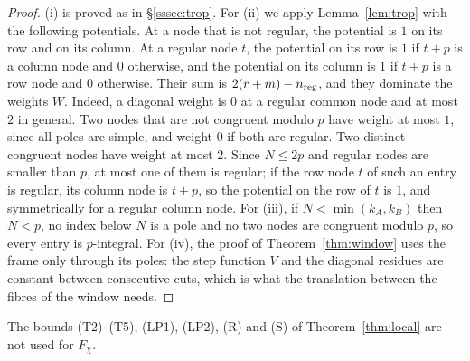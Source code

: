 \documentclass[11pt]{amsart}
\theoremstyle{definition}
\theoremstyle{remark}
\numberwithin{equation}{section}
\begin{document}
\begin{proof}
(i) is proved as in \S\ref{sssec:trop}. For (ii) we apply Lemma~\ref{lem:trop} with the following potentials. At a node
that is not regular, the potential is $1$ on its row and on its column. At a regular node $t$, the potential on its row is
$1$ if $t+p$ is a column node and $0$ otherwise, and the potential on its column is $1$ if $t+p$ is a row node and $0$
otherwise. Their sum is $2(r+m)-n_{\rm reg}$, and they dominate the weights $W$. Indeed, a diagonal weight is $0$ at a regular
common node and at most $2$ in general. Two nodes that are not congruent modulo $p$ have weight at most $1$, since all
poles are simple, and weight $0$ if both are regular. Two distinct congruent nodes have weight at most $2$. Since $N\le2p$
and regular nodes are smaller than $p$, at most one of them is regular; if the row node $t$ of such an entry is regular,
its column node is $t+p$, so the potential on the row of $t$ is $1$, and symmetrically for a regular column node. For (iii), if $N<\min(k_A,k_B)$ then $N<p$, no index below $N$ is a
pole and no two nodes are congruent modulo $p$, so every entry is $p$-integral. For (iv), the proof of
Theorem~\ref{thm:window} uses the frame only through its poles: the step function $V$ and the diagonal residues are
constant between consecutive cuts, which is what the translation between the fibres of the window needs.
\end{proof}

The bounds (T2)--(T5), (LP1), (LP2), (R) and (S) of Theorem~\ref{thm:local} are not used for $F_\chi$.
\end{document}
